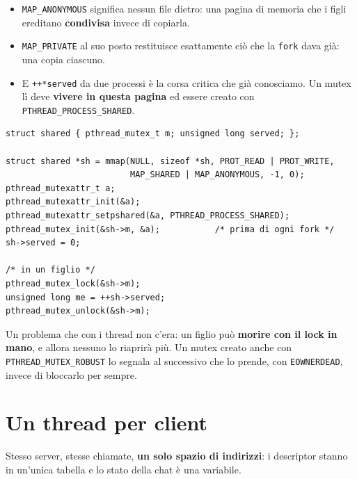 \begin{itemize}
    \item \texttt{MAP\_ANONYMOUS} significa nessun file dietro: una pagina di memoria che i figli ereditano
          \textbf{condivisa} invece di copiarla.
    \item \texttt{MAP\_PRIVATE} al suo posto restituisce esattamente ciò che la \texttt{fork} dava già: una copia ciascuno.
    \item E \texttt{++*served} da due processi è la corsa critica che già conosciamo. Un mutex lì deve \textbf{vivere in
          questa pagina} ed essere creato con \texttt{PTHREAD\_PROCESS\_SHARED}.
\end{itemize}

\begin{lstlisting}[language={[POSIX]C}, style=wnumbers, title={Il mutex nella pagina condivisa}]
struct shared { pthread_mutex_t m; unsigned long served; };

struct shared *sh = mmap(NULL, sizeof *sh, PROT_READ | PROT_WRITE,
                         MAP_SHARED | MAP_ANONYMOUS, -1, 0);
pthread_mutexattr_t a;
pthread_mutexattr_init(&a);
pthread_mutexattr_setpshared(&a, PTHREAD_PROCESS_SHARED);
pthread_mutex_init(&sh->m, &a);           /* prima di ogni fork */
sh->served = 0;

/* in un figlio */
pthread_mutex_lock(&sh->m);
unsigned long me = ++sh->served;
pthread_mutex_unlock(&sh->m);
\end{lstlisting}

Un problema che con i thread non c'era: un figlio può \textbf{morire con il lock in mano}, e allora nessuno lo riaprirà
più. Un mutex creato anche con \texttt{PTHREAD\_MUTEX\_ROBUST} lo segnala al successivo che lo prende, con
\texttt{EOWNERDEAD}, invece di bloccarlo per sempre.

\section{Un thread per client}

Stesso server, stesse chiamate, \textbf{un solo spazio di indirizzi}: i descriptor stanno in un'unica tabella e lo stato
della chat è una variabile.

